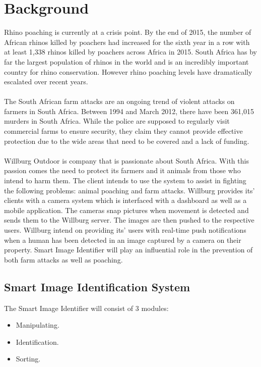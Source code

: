 \documentclass[a4paper,12pt]{report}
\begin{document}
\section {Background}
Rhino poaching is currently at a crisis point. By the end of 2015, the number of African rhinos killed by poachers had increased for the sixth year in a row with at least 1,338 rhinos killed by poachers across Africa in 2015. South Africa has by far the largest population of rhinos in the world and is an incredibly important country for rhino conservation. However rhino poaching levels have dramatically escalated over recent years. \\
\\The South African farm attacks are an ongoing trend of violent attacks on farmers in South Africa. Between 1994 and March 2012, there have been 361,015 murders in South Africa. While the police are supposed to regularly visit commercial farms to ensure security, they claim they cannot provide effective protection due to the wide areas that need to be covered and a lack of funding.\\
\\Willburg Outdoor is company that is passionate about South Africa. With this passion comes the need to protect its farmers and it animals from those who intend to harm them. The client intends to use the system to assist in fighting the following problems: animal poaching and farm attacks. 
Willburg provides its' clients with a camera system which is interfaced with a dashboard as well as a mobile application. The cameras snap pictures when movement is detected and sends them to the Willburg server. The images are then pushed to the respective users. Willburg intend on providing its' users with real-time push notifications when a human has been detected in an image captured by a camera on their property. Smart Image Identifier will play an influential role in the prevention of both farm attacks as well as poaching.

\subsection {Smart Image Identification System}
The Smart Image Identifier will consist of 3 modules:
	\begin {itemize}
		\item Manipulating.  
		\item Identification.
		\item Sorting.
	\end {itemize}
\end{document}
